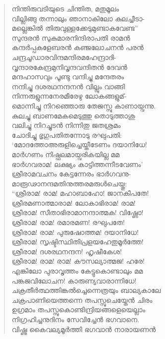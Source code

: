 \begin{verse}
നിന്തിരുവടിയുടെ ചിന്തിത, മതുമൂലം\\
വില്ലിങ്ങു തന്നാലും ഞാനാകിലോ കുലച്ചീടാ-\\
മല്ലെങ്കില്‍ തിരുവുള്ളക്കേടുമുണ്ടാകവേണ്ട”\\
സുന്ദരന്‍ സുകുമാരനിന്ദിരാപതി രാമന്‍\\
കന്ദര്‍പ്പകളേബരന്‍ കഞ്ജലോചനന്‍ പരന്‍\\
ചന്ദ്രചൂഡാരവിന്ദമന്ദിരമഹേന്ദ്രാദി-\\
വൃന്ദാരകേന്ദ്രമുനിവൃന്ദവന്ദിതന്‍ ദേവന്‍\\
മന്ദഹാസവും പൂണ്ടു വന്ദിച്ചു മന്ദേതരം\\
നന്ദിച്ചു ദശരഥനന്ദനന്‍ വില്ലും വാങ്ങി\\
നിന്നരുളുന്നനേരമീരേഴു ലോകങ്ങളുമ്-\\
മൊന്നിച്ചു നിറഞ്ഞൊരു തേജസ്സു കാണായ്വന്നു.\\
കുലച്ചു ബാണമേകമെടുത്തു തൊടുത്താശു\\
വലിച്ചു നിറച്ചുടന്‍ നിന്നിതു ജതശ്രമം\\
ചോദിച്ചു ഭൃഗുപതിതന്നോടു രഘുപതി:\\
‘മോദത്തോഅരുളിച്ചെയ്തീടേണം ദയാനിധേ!\\
മാര്‍ഗണം നിഷ്ഫലമായ്വരികയില്ല മമ\\
ഭാര്‍ഗവരാമ! ലക്ഷ്യം കാട്ടിത്തന്നീടവേണം’\\
ശ്രീരാമവചനം കേട്ടന്നേരം ഭാര്‍ഗവനു-\\
മാരൂഢാനന്ദമതിനുത്തരമരുള്‍ചെയ്തു:\\
“ശ്രീരാമ! രാമ! മഹാബാഹോ! ജാനകീപതേ!\\
ശ്രീരമണാത്മാരാമ! ലോകാഭിരാമ! രാമ!\\
ശ്രീരാമ! സീതാഭിരാമാനന്ദാത്മക! വിഷ്ണോ!\\
ശ്രീരാമ! രാമ! രമാരമണ! രഘുപതേ!\\
ശ്രീരാമ! രാമ! പുരുഷോത്തമ! ദയാനിധേ!\\
ശ്രീരാമ! സൃഷ്ടിസ്ഥിതിപ്രളയഹേതുമൂര്‍ത്തേ!\\
ശ്രീരാമ! ദശരഥനന്ദന! ഹൃഷീകേശ!\\
ശ്രീരാമ! രാമ! രാമ! കൗസല്യാത്മജ! ഹരേ!\\
എങ്കിലോ പുരാവൃത്തം കേട്ടുകൊണ്ടാലും മമ\\
പങ്കജവിലോചന! കാരുണ്യവാരാന്നിധേ!\\
ചക്രതീര്‍ത്ഥത്തിങ്കല്‍ച്ചെന്നെത്രയും ബാല്യകാലേ\\
ചക്രപാണിയെത്തന്നെ തപസ്സുചെയ്തേന്‍ ചിരം\\
ഉഗ്രമാം തപസ്സുകൊണ്ടിന്ദ്രിയങ്ങളെയെല്ലാം\\
നിഗ്രഹിച്ചനുദിനം സേവിച്ചേന്‍ ഭഗവാനെ.\\
വിഷ്ണു കൈവല്യമൂര്‍ത്തി ഭഗവാന്‍ നാരായണന്‍\\

\end{verse}
